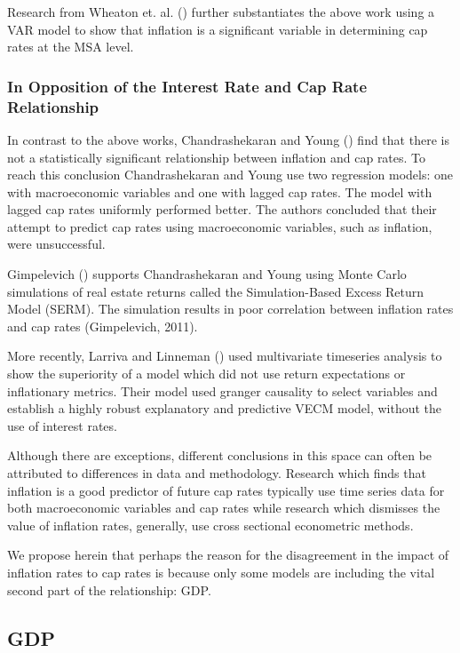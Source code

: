Research from Wheaton et. al. (\citeyear{wheaton2001real}) further substantiates the above work using a VAR model to show that inflation is a significant variable in determining cap rates at the MSA level. 

\subsubsection{In Opposition of the Interest Rate and Cap Rate Relationship}
In contrast to the above works, Chandrashekaran and Young (\citeyear{chandrashekaran2000predictability}) find that there is not a statistically significant relationship between inflation and cap rates. To reach this conclusion Chandrashekaran and Young use two regression models: one with macroeconomic variables and one with lagged cap rates. The model with lagged cap rates uniformly performed better. The authors concluded that their attempt to predict cap rates using macroeconomic variables, such as inflation, were unsuccessful. 

Gimpelevich (\citeyear{Gimpelevich2011}) supports Chandrashekaran and Young using Monte Carlo simulations of real estate returns called the Simulation-Based Excess Return Model (SERM). The simulation results in poor correlation between inflation rates and cap rates (Gimpelevich, 2011).

More recently, Larriva and Linneman (\citeyear{larriva2021determinants}) used multivariate timeseries analysis to show the superiority of a model which did not use return expectations or inflationary metrics. Their model used granger causality to select variables and establish a highly robust explanatory and predictive VECM model, without the use of interest rates.

Although there are exceptions, different conclusions in this space can often be attributed to differences in data and methodology. Research which finds that inflation is a good predictor of future cap rates typically use time series data for both macroeconomic variables and cap rates while research which dismisses the value of inflation rates, generally, use cross sectional econometric methods.

We propose herein that perhaps the reason for the disagreement in the impact of inflation rates to cap rates is because only some models are including the vital second part of the relationship: GDP.


\subsection{GDP}

